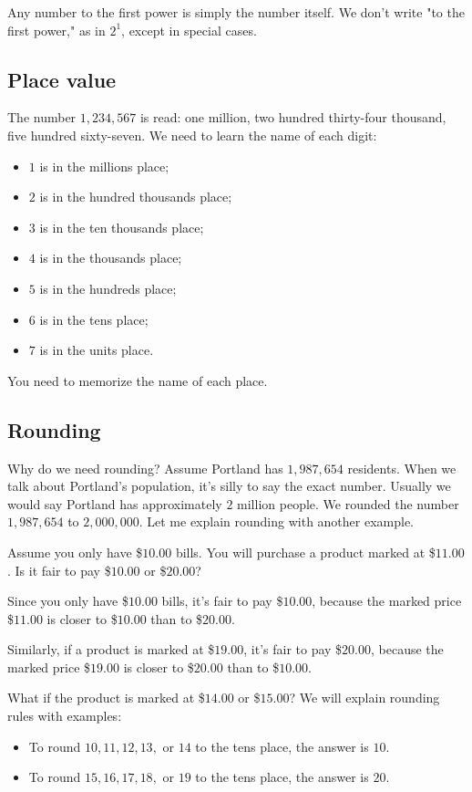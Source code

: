 Any number to the first power is simply the number itself. We don't write "to the first power," as in $2^{1}$, except in special cases.

\subsection{Place value}
The number $1,234,567$ is read: one million, two hundred thirty-four thousand, five hundred sixty-seven. We need to learn the name of each digit:
\begin{itemize}
\item $1$ is in the millions place;
\item $2$ is in the hundred thousands place;
\item $3$ is in the ten thousands place;
\item $4$ is in the thousands place;
\item $5$ is in the hundreds place;
\item $6$ is in the tens place;
\item $7$ is in the units place.
\end{itemize}

You need to memorize the name of each place.

\subsection{Rounding}
Why do we need rounding? Assume Portland has $1,987,654$ residents. When we talk about Portland's population, it's silly to say the exact number. Usually we would say Portland has approximately $2$ million people. We rounded the number $1,987,654$ to $2,000,000$. Let me explain rounding with another example.

Assume you only have \$$10.00$ bills. You will purchase a product marked at \$$11.00$. Is it fair to pay \$$10.00$ or \$$20.00$?

Since you only have \$$10.00$ bills, it's fair to pay \$$10.00$, because the marked price \$$11.00$ is closer to \$$10.00$ than to \$$20.00$.

Similarly, if a product is marked at \$$19.00$, it's fair to pay \$$20.00$, because the marked price \$$19.00$ is closer to \$$20.00$ than to \$$10.00$.

What if the product is marked at \$$14.00$ or \$$15.00$? We will explain  rounding rules with examples:

\begin{itemize}
\item To round $10,11,12,13,\text{ or }14$ to the tens place, the answer is $10$.
\item To round $15,16,17,18,\text{ or }19$ to the tens place, the answer is $20$.
\end{itemize}

